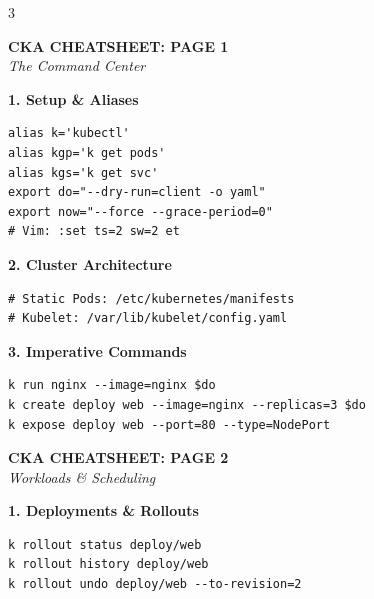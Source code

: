 \documentclass[10pt,landscape]{article}
\newcommand{\sectionheader}[1]{%
    \vspace{2pt}\noindent\colorbox{blue!15}{\parbox{\dimexpr\linewidth-2\fboxsep}{%
    \textbf{#1}}}\vspace{2pt}%
}
\begin{document}
\begin{multicols*}{3}

\begin{center}\textbf{\Large CKA CHEATSHEET: PAGE 1}\\\textit{The Command Center}\end{center}

\sectionheader{1. Setup \& Aliases}
\begin{lstlisting}
alias k='kubectl'
alias kgp='k get pods'
alias kgs='k get svc'
export do="--dry-run=client -o yaml"
export now="--force --grace-period=0"
# Vim: :set ts=2 sw=2 et
\end{lstlisting}

\sectionheader{2. Cluster Architecture}
\begin{center}
\end{center}
\begin{lstlisting}
# Static Pods: /etc/kubernetes/manifests
# Kubelet: /var/lib/kubelet/config.yaml
\end{lstlisting}

\sectionheader{3. Imperative Commands}
\begin{lstlisting}
k run nginx --image=nginx $do
k create deploy web --image=nginx --replicas=3 $do
k expose deploy web --port=80 --type=NodePort
\end{lstlisting}

\columnbreak

\begin{center}\textbf{\Large CKA CHEATSHEET: PAGE 2}\\\textit{Workloads \& Scheduling}\end{center}

\sectionheader{1. Deployments \& Rollouts}
\begin{center}
\end{center}
\begin{lstlisting}
k rollout status deploy/web
k rollout history deploy/web
k rollout undo deploy/web --to-revision=2
\end{lstlisting}


\end{multicols*}
\end{document}
